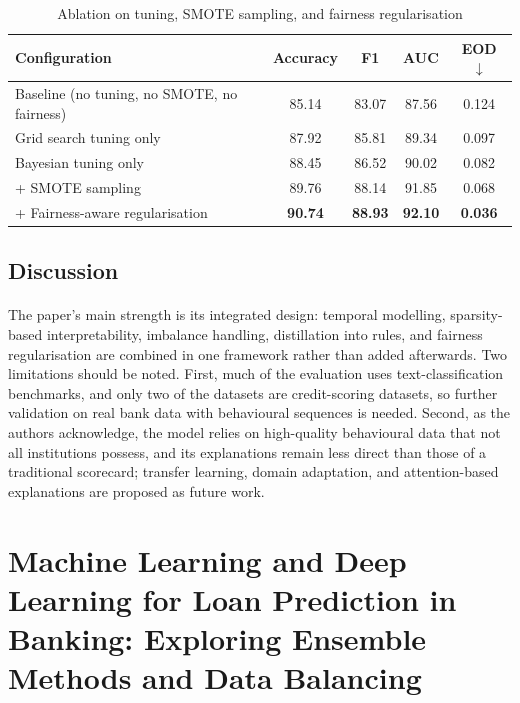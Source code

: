 \documentclass[12pt,a4paper,final]{extreport}
\begin{document}
{\renewcommand{\arraystretch}{1.2}
\begin{table}[htbp]
\centering
\caption{Ablation on tuning, SMOTE sampling, and fairness regularisation \cite{p1}}\label{tab:p1_ablation}
\small
\begin{tabular}{|l|c|c|c|c|}
\hline
\textbf{Configuration} & \textbf{Accuracy} & \textbf{F1} & \textbf{AUC} & \textbf{EOD} $\downarrow$ \\ \hline
Baseline (no tuning, no SMOTE, no fairness) & 85.14 & 83.07 & 87.56 & 0.124 \\ \hline
Grid search tuning only & 87.92 & 85.81 & 89.34 & 0.097 \\ \hline
Bayesian tuning only & 88.45 & 86.52 & 90.02 & 0.082 \\ \hline
+ SMOTE sampling & 89.76 & 88.14 & 91.85 & 0.068 \\ \hline
+ Fairness-aware regularisation & \textbf{90.74} & \textbf{88.93} & \textbf{92.10} & \textbf{0.036} \\ \hline
\end{tabular}
\end{table}}

\subsection{Discussion}

\paragraph{} The paper's main strength is its integrated design: temporal modelling, sparsity-based interpretability, imbalance handling, distillation into rules, and fairness regularisation are combined in one framework rather than added afterwards. Two limitations should be noted. First, much of the evaluation uses text-classification benchmarks, and only two of the datasets are credit-scoring datasets, so further validation on real bank data with behavioural sequences is needed. Second, as the authors acknowledge, the model relies on high-quality behavioural data that not all institutions possess, and its explanations remain less direct than those of a traditional scorecard; transfer learning, domain adaptation, and attention-based explanations are proposed as future work.

\section{Machine Learning and Deep Learning for Loan Prediction in Banking: Exploring Ensemble Methods and Data Balancing}
\end{document}
